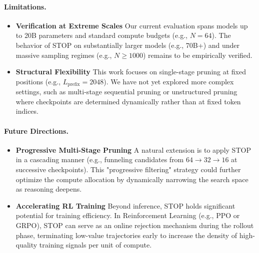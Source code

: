 \documentclass[11pt]{article}
\theoremstyle{plain}
\begin{document}
\paragraph{Limitations.}
\begin{itemize}
    \item \textbf{Verification at Extreme Scales} Our current evaluation spans models up to 20B parameters and standard compute budgets (e.g., $N=64$). The behavior of STOP on substantially larger models (e.g., 70B+) and under massive sampling regimes (e.g., $N \ge 1000$) remains to be empirically verified.
    \item \textbf{Structural Flexibility} This work focuses on single-stage pruning at fixed positions (e.g., $L_{\text{prefix}}=2048$). We have not yet explored more complex settings, such as multi-stage sequential pruning or unstructured pruning where checkpoints are determined dynamically rather than at fixed token indices.
\end{itemize}

\paragraph{Future Directions.}
\begin{itemize}
    \item \textbf{Progressive Multi-Stage Pruning} A natural extension is to apply STOP in a cascading manner (e.g., funneling candidates from $64 \to 32 \to 16$ at successive checkpoints). This "progressive filtering" strategy could further optimize the compute allocation by dynamically narrowing the search space as reasoning deepens.
    \item \textbf{Accelerating RL Training} Beyond inference, STOP holds significant potential for training efficiency. In Reinforcement Learning (e.g., PPO or GRPO), STOP can serve as an online rejection mechanism during the rollout phase, terminating low-value trajectories early to increase the density of high-quality training signals per unit of compute.
\end{itemize}

%


\newpage
\appendix
\end{document}
